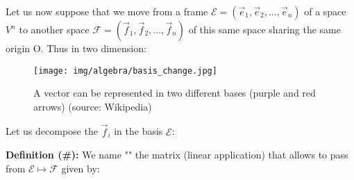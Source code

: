 	Let us now suppose that we move from a frame $\mathcal{E}=(\vec{e}_1,\vec{e}_2,...,\vec{e}_n)$ of a space $V^n$ to another space $\mathcal{F}=(\vec{f}_1,\vec{f}_2,...,\vec{f}_n)$ of this same space sharing the same origin O. Thus in two dimension:
	\begin{figure}[H]
		\centering
		\texttt{[image: img/algebra/basis\_change.jpg]}
		\caption{A vector can be represented in two different bases (purple and red arrows) (source: Wikipedia)}
	\end{figure}
	Let us decompose the $\vec{f}_i$ in the basis $\mathcal{E}$:
	
	\textbf{Definition (\#\mydef):} We name "" the matrix (linear application) that allows to pass from $\mathcal{E}\mapsto \mathcal{F}$ given by:
	
